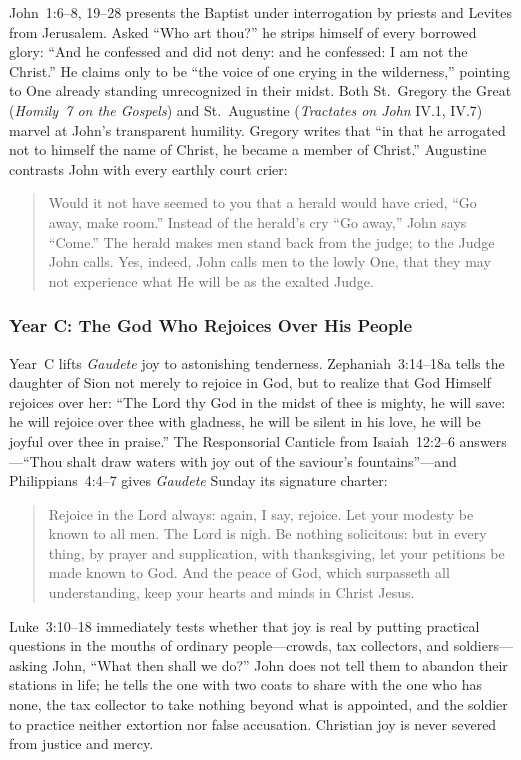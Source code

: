 John~1:6--8, 19--28 presents the Baptist under interrogation by priests and Levites from Jerusalem. Asked ``Who art thou?'' he strips himself of every borrowed glory: ``And he confessed and did not deny: and he confessed: I am not the Christ.'' He claims only to be ``the voice of one crying in the wilderness,'' pointing to One already standing unrecognized in their midst. Both St.~Gregory the Great (\textit{Homily~7 on the Gospels}) and St.~Augustine (\textit{Tractates on John} IV.1, IV.7) marvel at John's transparent humility. Gregory writes that ``in that he arrogated not to himself the name of Christ, he became a member of Christ.'' Augustine contrasts John with every earthly court crier:

\begin{quote}
Would it not have seemed to you that a herald would have cried, ``Go away, make room.'' Instead of the herald's cry ``Go away,'' John says ``Come.'' The herald makes men stand back from the judge; to the Judge John calls. Yes, indeed, John calls men to the lowly One, that they may not experience what He will be as the exalted Judge.
\end{quote}

\subsubsection{Year C: The God Who Rejoices Over His People}

Year~C lifts \textit{Gaudete} joy to astonishing tenderness. Zephaniah~3:14--18a tells the daughter of Sion not merely to rejoice in God, but to realize that God Himself rejoices over her: ``The Lord thy God in the midst of thee is mighty, he will save: he will rejoice over thee with gladness, he will be silent in his love, he will be joyful over thee in praise.'' The Responsorial Canticle from Isaiah~12:2--6 answers---``Thou shalt draw waters with joy out of the saviour's fountains''---and Philippians~4:4--7 gives \textit{Gaudete} Sunday its signature charter:

\begin{quote}
Rejoice in the Lord always: again, I say, rejoice. Let your modesty be known to all men. The Lord is nigh. Be nothing solicitous: but in every thing, by prayer and supplication, with thanksgiving, let your petitions be made known to God. And the peace of God, which surpasseth all understanding, keep your hearts and minds in Christ Jesus.
\end{quote}

Luke~3:10--18 immediately tests whether that joy is real by putting practical questions in the mouths of ordinary people---crowds, tax collectors, and soldiers---asking John, ``What then shall we do?'' John does not tell them to abandon their stations in life; he tells the one with two coats to share with the one who has none, the tax collector to take nothing beyond what is appointed, and the soldier to practice neither extortion nor false accusation. Christian joy is never severed from justice and mercy.

